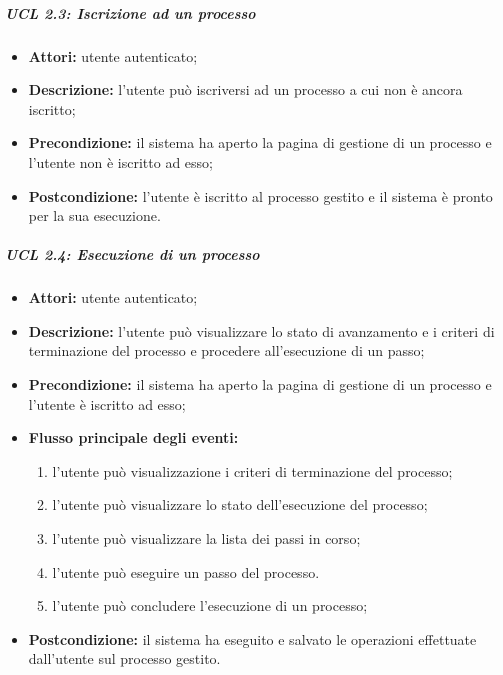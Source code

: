 \subparagraph{UCL 2.3: Iscrizione ad un processo}
\begin{itemize}
\item \textbf{Attori:} utente autenticato;
\item \textbf{Descrizione:} l'utente può iscriversi ad un processo a cui non è ancora iscritto;
\item \textbf{Precondizione:} il sistema ha aperto la pagina di gestione di un processo e l'utente non è iscritto ad esso;
\item \textbf{Postcondizione:} l'utente è iscritto al processo gestito e il sistema è pronto per la sua esecuzione.
\end{itemize}

\subparagraph{UCL 2.4: Esecuzione di un processo}
\begin{itemize}
\item \textbf{Attori:} utente autenticato;
\item \textbf{Descrizione:} l'utente può visualizzare lo stato di avanzamento e i criteri di terminazione del processo e procedere all'esecuzione di un passo;
\item \textbf{Precondizione:} il sistema ha aperto la pagina di gestione di un processo e l'utente è iscritto ad esso;
\item \textbf{Flusso principale degli eventi:}
\begin{enumerate}
\item l'utente può visualizzazione i criteri di terminazione del processo;
\item l'utente può visualizzare lo stato dell'esecuzione del processo;
\item l'utente può visualizzare la lista dei passi in corso;
\item l'utente può eseguire un passo del processo.
\item l'utente può concludere l'esecuzione di un processo;
\end{enumerate} 
\item \textbf{Postcondizione:} il sistema ha eseguito e salvato le operazioni effettuate dall'utente sul processo gestito.
\end{itemize}

